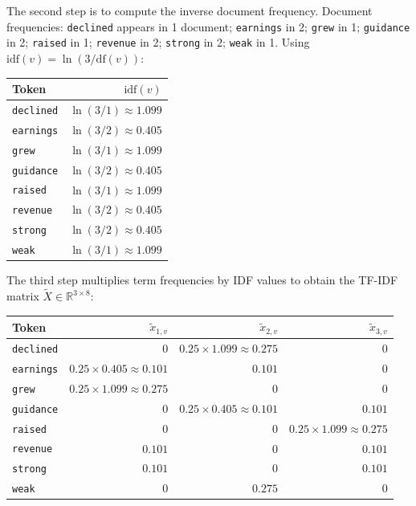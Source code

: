 \begin{deepdive}
\begin{example}
The second step is to compute the inverse document frequency. Document frequencies: \texttt{declined} appears in 1 document; \texttt{earnings} in 2;
\texttt{grew} in 1; \texttt{guidance} in 2; \texttt{raised} in 1; \texttt{revenue} in 2;
\texttt{strong} in 2; \texttt{weak} in 1.  Using $\mathrm{idf}(v)
= \ln(3 / \mathrm{df}(v))$:

\medskip
\begin{center}
\begin{tabular}{lr}
\toprule
Token & $\mathrm{idf}(v)$ \\
\midrule
\texttt{declined} & $\ln(3/1) \approx 1.099$ \\
\texttt{earnings} & $\ln(3/2) \approx 0.405$ \\
\texttt{grew}     & $\ln(3/1) \approx 1.099$ \\
\texttt{guidance} & $\ln(3/2) \approx 0.405$ \\
\texttt{raised}   & $\ln(3/1) \approx 1.099$ \\
\texttt{revenue}  & $\ln(3/2) \approx 0.405$ \\
\texttt{strong}   & $\ln(3/2) \approx 0.405$ \\
\texttt{weak}     & $\ln(3/1) \approx 1.099$ \\
\bottomrule
\end{tabular}
\end{center}

The third step multiplies term frequencies by IDF values to obtain the TF-IDF matrix
$\tilde{X} \in \mathbb{R}^{3 \times 8}$:

\medskip
\begin{center}
\setlength{\tabcolsep}{4pt}
\begin{tabular}{lrrr}
\toprule
Token & $\tilde{x}_{1,v}$ & $\tilde{x}_{2,v}$ & $\tilde{x}_{3,v}$ \\
\midrule
\texttt{declined} & 0       & $0.25 \times 1.099 \approx 0.275$ & 0 \\
\texttt{earnings} & $0.25 \times 0.405 \approx 0.101$ & $0.101$ & 0 \\
\texttt{grew}     & $0.25 \times 1.099 \approx 0.275$ & 0       & 0 \\
\texttt{guidance} & 0       & $0.25 \times 0.405 \approx 0.101$ & $0.101$ \\
\texttt{raised}   & 0       & 0       & $0.25 \times 1.099 \approx 0.275$ \\
\texttt{revenue}  & $0.101$ & 0       & $0.101$ \\
\texttt{strong}   & $0.101$ & 0       & $0.101$ \\
\texttt{weak}     & 0       & $0.275$ & 0 \\
\bottomrule
\end{tabular}
\end{center}


\end{example}
\end{deepdive}
